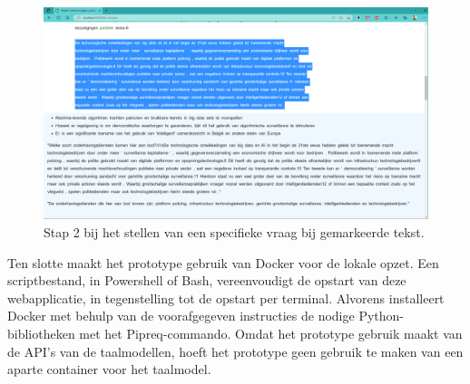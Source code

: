 \begin{center}
	\begin{figure}
		\includegraphics[width=\linewidth]{img/proto-vraagstelling-2.png}
		\caption{Stap 2 bij het stellen van een specifieke vraag bij gemarkeerde tekst.}
		\label{img:step-2-proto-vraagstelling}
	\end{figure}
\end{center}

\medspace

Ten slotte maakt het prototype gebruik van Docker voor de lokale opzet. Een scriptbestand, in Powershell of Bash, vereenvoudigt de opstart van deze webapplicatie, in tegenstelling tot de opstart per terminal. Alvorens installeert Docker met behulp van de voorafgegeven instructies de nodige Python-bibliotheken met het Pipreq-commando. Omdat het prototype gebruik maakt van de API's van de taalmodellen, hoeft het prototype geen gebruik te maken van een aparte container voor het taalmodel.

